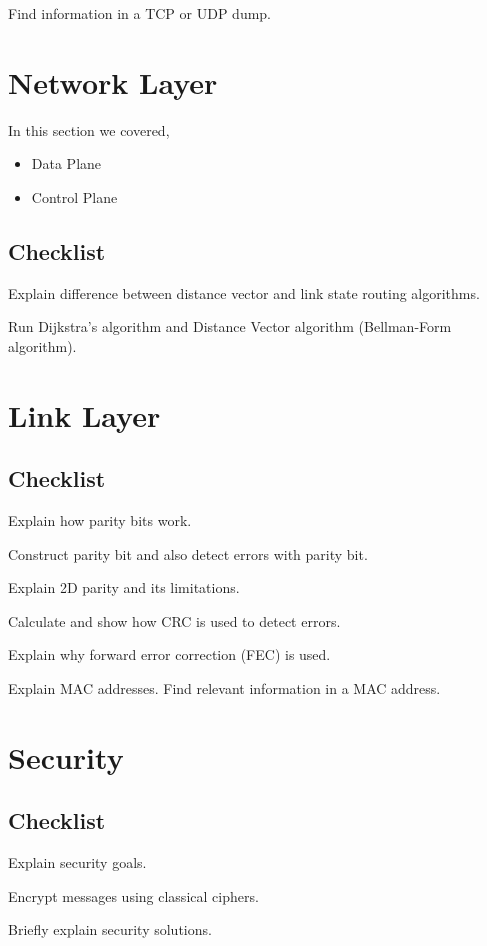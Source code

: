 \documentclass[a4paper, twoside]{book}
\begin{document}
Find information in a TCP or UDP dump.

\chapter{Network Layer}
In this section we covered,
\begin{itemize}
    \item Data Plane
    \item Control Plane
\end{itemize}

\section{Checklist}
Explain difference between distance vector and link state routing algorithms.

Run Dijkstra's algorithm and Distance Vector algorithm (Bellman-Form
algorithm).

\chapter{Link Layer}

\section{Checklist}
Explain how parity bits work.

Construct parity bit and also detect errors with parity bit.

Explain 2D parity and its limitations.

Calculate and show how CRC is used to detect errors.

Explain why forward error correction (FEC) is used.

Explain MAC addresses. Find relevant information in a MAC address.

\chapter{Security}

\section{Checklist}
Explain security goals.

Encrypt messages using classical ciphers.

Briefly explain security solutions.
\end{document}

